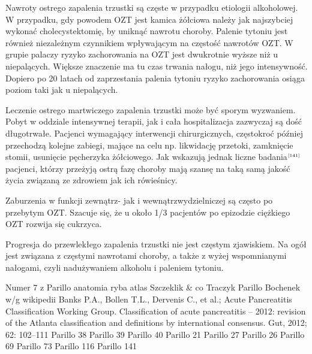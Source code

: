 \documentclass[a4paper, 12pt]{report}
\newcommand\cyt[1]{$^{\tiny{\cite{#1}}}$}
\begin{document}
Nawroty ostrego zapalenia trzustki są częste w przypadku etiologii
alkoholowej. W przypadku, gdy powodem OZT jest kamica żółciowa należy
jak najszybciej wykonać cholecystektomię, by uniknąć nawrotu
choroby. Palenie tytoniu jest również niezależnym czynnikiem wpływającym na
częstość nawrotów OZT. W grupie palaczy ryzyko zachorowania na OZT
jest dwukrotnie wyższe niż u niepalących. Większe znaczenie ma tu czas trwania
nałogu, niż jego intensywność. Dopiero po 20 latach od zaprzestania
palenia tytoniu ryzyko zachorowania osiąga poziom taki jak u
niepalących.

Leczenie ostrego martwiczego zapalenia trzustki może być sporym
wyzwaniem. Pobyt w oddziale intensywnej terapii, jak i cała
hospitalizacja zazwyczaj są dość długotrwałe. Pacjenci wymagający
interwencji chirurgicznych, częstokroć później przechodzą kolejne
zabiegi, mające na celu np. likwidację przetoki, zamknięcie stomii,
usunięcie pęcherzyka żółciowego. Jak wskazują jednak liczne
badania\cyt{141} pacjenci, którzy przeżyją ostrą fazę choroby mają
szansę na taką samą jakość życia związaną ze zdrowiem jak ich
rówieśnicy.

Zaburzenia w funkcji zewnątrz- jak i wewnątrzwydzielniczej są często
po przebytym OZT. Szacuje się, że u około 1/3 pacjentów po epizodzie
ciężkiego OZT rozwija się cukrzyca.

Progresja do przewlekłego zapalenia trzustki nie jest częstym
zjawiskiem. Na ogół jest związana z częstymi nawrotami choroby, a także z
wyżej wspomnianymi nałogami, czyli nadużywaniem alkoholu i paleniem
tytoniu.


\begin{thebibliography}{99}
 Numer 7 z Parillo
 anatomia
 ryba
 atlas
 Szczeklik \& co
 Traczyk
 Parillo
 Bochenek w/g wikipedii
 Banks P.A., Bollen T.L., Dervenis C., et al.; Acute
  Pancreatitis Classification Working Group. Classification of acute
  pancreatitis – 2012: revision of the Atlanta classification and
  definitions by international consensus. Gut, 2012; 62: 102–111
 Parillo 38
 Parillo 39
 Parillo 40
 Parillo 21
 Parillo 27
 Parillo 26
 Parillo 69
 Parillo 73
 Parillo 116
 Parillo 141
\end{thebibliography}
\end{document}
